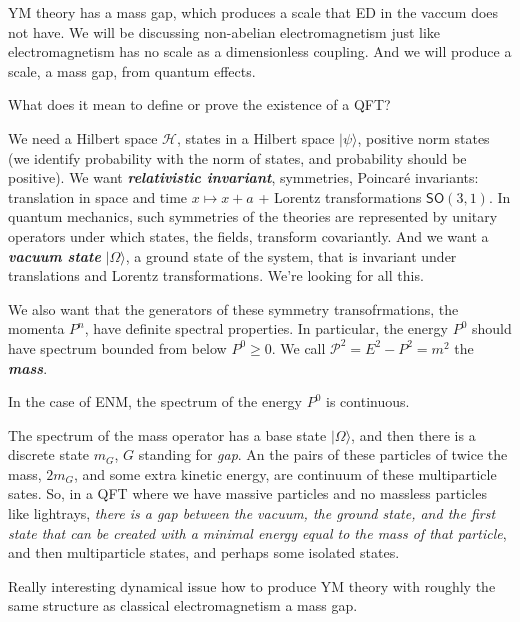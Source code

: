 YM theory has a mass gap, which produces a scale that ED in the vaccum does not
have. We will be discussing non-abelian electromagnetism just like
electromagnetism has no scale as a dimensionless coupling. And we will produce a
scale, a mass gap, from quantum effects.

\begin{question}\leavevmode
	What does it mean to define or prove the existence of a QFT?
\end{question}

We need a Hilbert space $\mathcal{H}$, states in a Hilbert space $|\psi\rangle$,
positive norm states (we identify probability with the norm of states, and
probability should be positive). We want \textit{\textbf{relativistic
invariant}}, symmetries, Poincaré invariants: translation in space and time $x
\mapsto x+a$ + Lorentz transformations $\mathsf{SO}(3,1)$. In quantum mechanics,
such symmetries of the theories are represented by unitary operators under which
states, the fields, transform covariantly. And we want a \textit{\textbf{vacuum
state}} $|\Omega\rangle$, a ground state of the system, that is invariant under
translations and Lorentz transformations. We're looking for all this.

We also want that the generators of these symmetry transofrmations, the momenta
$P^n$, have definite spectral properties. In particular, the energy $P^0$ should
have spectrum bounded from below $P^0\geq 0$. We call
$\mathcal{P}^2=E^2-P^2=m^2$ the \textit{\textbf{mass}}.

In the case of ENM, the spectrum of the energy  $P^0$ is continuous.

The spectrum of the mass operator has a base state $|\Omega\rangle$, and then
there is a discrete state $m_G$, $G$ standing for \textit{gap}. An the pairs of
these particles of twice the mass, $2m_G$, and some extra kinetic energy, are
continuum of these multiparticle sates. So, in a QFT where we have massive
particles and no massless particles like lightrays, \textit{there is a gap
between the vacuum, the ground state, and the first state that can be created
with a minimal energy equal to the mass of that particle}, and then
multiparticle states, and perhaps some isolated states.

\begin{thing5}{Really interesting dynamical issue}\leavevmode
 how to produce YM theory with roughly the same structure as classical
 electromagnetism a mass gap.
\end{thing5}

